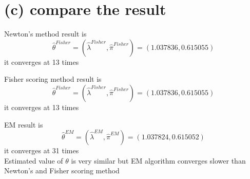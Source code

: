 \documentclass[11pt]{article}
\begin{document}
    \section{(c) compare the result}\label{c-compare-the-result}

Newton's method result is \[
\hat{\theta}^{Fisher} = (\hat{\lambda}^{Fisher},\hat{\pi}^{Fisher})=(1.037836,  0.615055)\]
it converges at 13 times

Fisher scoring method result is \[
\hat{\theta}^{Fisher} = (\hat{\lambda}^{Fisher},\hat{\pi}^{Fisher})=(1.037836,  0.615055)\]
it converges at 13 times

EM result is \[
\hat{\theta}^{EM} = (\hat{\lambda}^{EM},\hat{\pi}^{EM})=(   1.037824    ,0.615052)\]
it converges at 31 times\\
Estimated value of \(\theta\) is very similar but EM algorithm converges
slower than Newton's and Fisher scoring method


    
    
    
    
\end{document}

